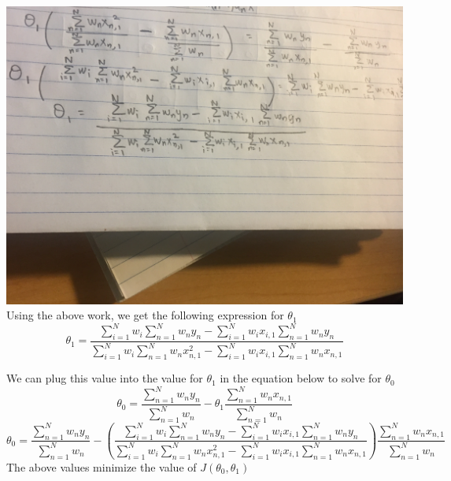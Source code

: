 \documentclass[11pt]{article}
\begin{document}
\begin{enumerate}
\includegraphics[scale=0.1]{3b_2.jpg} \newline
Using the above work, we get the following expression for $\theta_1$
$$
\theta_1 = 
\frac{
\sum_{i=1}^N w_i \sum_{n=1}^N w_n y_n - \sum_{i=1}^N w_i x_{i,1} \sum_{n=1}^N w_n y_n
}{
\sum_{i=1}^N w_i \sum_{n=1}^N w_n x_{n,1}^2 - \sum_{i=1}^N w_i x_{i,1} \sum_{n=1}^N w_n x_{n,1}
}
$$

We can plug this value into the value for $\theta_1$ in the equation below to solve for $\theta_0$
$$
\theta_0 = 
\frac{\sum_{n=1}^N w_n y_n}{\sum_{n=1}^N w_n} - \theta_1 \frac{\sum_{n=1}^N w_n x_{n,1}}{\sum_{n=1}^N w_n}
$$
$$
\theta_0 = 
\frac{\sum_{n=1}^N w_n y_n}{\sum_{n=1}^N w_n} - 
\left(
\frac{
\sum_{i=1}^N w_i \sum_{n=1}^N w_n y_n - \sum_{i=1}^N w_i x_{i,1} \sum_{n=1}^N w_n y_n
}{
\sum_{i=1}^N w_i \sum_{n=1}^N w_n x_{n,1}^2 - \sum_{i=1}^N w_i x_{i,1} \sum_{n=1}^N w_n x_{n,1}
} \right)
 \frac{\sum_{n=1}^N w_n x_{n,1}}{\sum_{n=1}^N w_n}
$$
The above values minimize the value of $J(\theta_0, \theta_1)$
\end{enumerate}
\newpage
\end{document}
